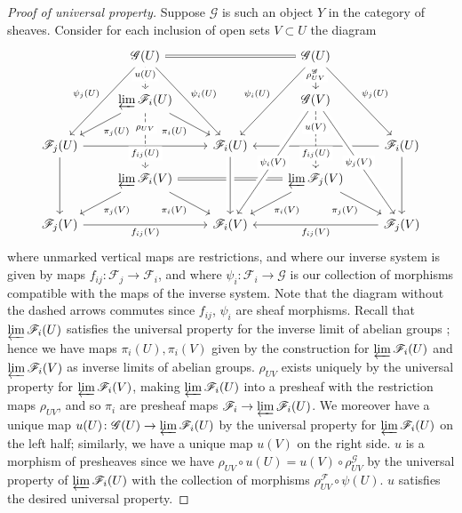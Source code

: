 \documentclass[10pt]{article}
\theoremstyle{definition}
\theoremstyle{remark}
\numberwithin{equation}{section}
\numberwithin{figure}{subsubsection}
\begin{document}
\begin{proof}[Proof of universal property]
  Suppose $\mathscr{G}$ is such an object $Y$ in the category of sheaves. Consider for each inclusion of open sets $V \subset U$ the diagram
  \begin{equation*}
    \begin{tikzcd}[row sep=small]
      {}& \mathscr{G}(U) \arrow[equal]{rr}\arrow[dashed]{dd}[description,yshift=3pt]{u(U)}\arrow{ddddl}[swap]{\psi_j(U)}\arrow{ddddr}{\psi_i(U)} & & \mathscr{G}(U)\arrow{dd}[description,yshift=3pt]{\rho_{UV}^\mathscr{G}}\arrow{ddddl}[swap]{\psi_i(U)}\arrow{ddddr}{\psi_j(U)}\\
      \\
      & \varprojlim \mathscr{F}_i(U)\arrow{ddl}{\pi_j(U)}\arrow{ddr}[swap]{\pi_i(U)}\arrow[dashed]{ddd}[description,yshift=10pt]{\rho_{UV}} & & \mathscr{G}(V)\arrow[dashed]{ddd}[description,yshift=10pt]{u(V)}\\
      \\
      \mathscr{F}_j(U) \arrow{rr}[swap,fill=white]{f_{ij}(U)}\arrow{ddd} & & \mathscr{F}_i(U) & & \mathscr{F}_i(U)\arrow{ll}[fill=white]{f_{ij}(U)}\arrow{ddd}\\
      & \varprojlim \mathscr{F}_i(V) \arrow[equal]{rr}\arrow{ddl}{\pi_j(V)}\arrow{ddr}[swap]{\pi_i(V)} & & \varprojlim \mathscr{F}_j(V)\arrow{ddl}{\pi_i(V)}\arrow{ddr}[swap]{\pi_j(V)}\\
      \\
      \mathscr{F}_j(V) \arrow{rr}[swap]{f_{ij}(V)} & & \mathscr{F}_i(V)\arrow[leftarrow,crossing over]{uuu}\arrow[leftarrow,crossing over]{uuuuur}[description]{\psi_i(V)} & & \mathscr{F}_j(V)\arrow{ll}{f_{ij}(V)}\arrow[leftarrow,crossing over]{uuuuul}[description]{\psi_j(V)}
    \end{tikzcd}
  \end{equation*}
  where unmarked vertical maps are restrictions, and where our inverse system is given by maps $f_{ij}\colon \mathscr{F}_j \to \mathscr{F}_i$, and where $\psi_i\colon \mathscr{F}_i \to \mathscr{G}$ is our collection of morphisms compatible with the maps of the inverse system. Note that the diagram without the dashed arrows commutes since $f_{ij}$, $\psi_i$ are sheaf morphisms. Recall that $\varprojlim\mathscr{F}_i(U)$ satisfies the universal property for the inverse limit of abelian groups \cite[III, Thm.~10.2]{Lan02}; hence we have maps $\pi_i(U),\pi_i(V)$ given by the construction for $\varprojlim\mathscr{F}_i(U)$ and $\varprojlim\mathscr{F}_i(V)$ as inverse limits of abelian groups. $\rho_{UV}$ exists uniquely by the universal property for $\varprojlim\mathscr{F}_i(V)$, making $\varprojlim \mathscr{F}_i(U)$ into a presheaf with the restriction maps $\rho_{UV}$, and so $\pi_i$ are presheaf maps $\mathscr{F}_i \to \varprojlim \mathscr{F}_i(U)$. We moreover have a unique map $u(U)\colon \mathscr{G}(U) \to \varprojlim \mathscr{F}_i(U)$ by the universal property for $\varprojlim\mathscr{F}_i(U)$ on the left half; similarly, we have a unique map $u(V)$ on the right side. $u$ is a morphism of presheaves since we have $\rho_{UV} \circ u(U) = u(V) \circ \rho_{UV}^\mathscr{G}$ by the universal property of $\varprojlim\mathscr{F}_i(U)$ with the collection of morphisms $\rho_{UV}^\mathscr{F} \circ \psi(U)$. $u$ satisfies the desired universal property.

\end{proof}
\end{document}

